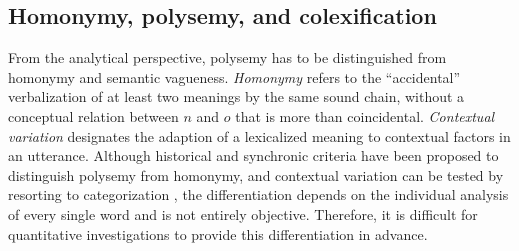 \subsection{Homonymy, polysemy, and colexification}
 
From the analytical perspective, polysemy has
to be distinguished from homonymy and semantic vagueness. \emph{Homonymy} refers to the
``accidental'' verbalization of at least two meanings by the same sound chain, without a conceptual
relation between $n$ and $o$ that is more than coincidental. \emph{Contextual variation}
designates the adaption of a lexicalized meaning to contextual factors in an utterance. Although
historical and synchronic criteria have been proposed to distinguish polysemy from homonymy, and
contextual variation can be tested by resorting to categorization \cite{blank1997}, the
differentiation depends on the individual analysis of every single word and is not entirely
objective. Therefore, it is difficult for quantitative investigations to provide this differentiation
in advance.

